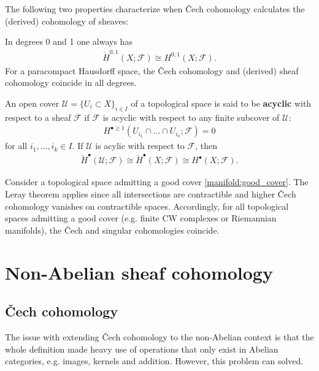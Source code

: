     The following two properties characterize when \v{C}ech cohomology calculates the (derived) cohomology of sheaves:
    \begin{property}
        In degrees 0 and 1 one always has
        \begin{gather}
            \check{H}^{0,1}(X;\mathcal{F})\cong H^{0,1}(X;\mathcal{F}).
        \end{gather}
        For a paracompact Hausdorff space, the \v{C}ech cohomology and (derived) sheaf cohomology coincide in all degrees.
    \end{property}
    \begin{property}[Leray]
        An open cover $\mathcal{U}=\{U_i\subset X\}_{i\in I}$ of a topological space is said to be \textbf{acyclic} with respect to a sheaf $\mathcal{F}$ if $\mathcal{F}$ is acyclic with respect to any finite subcover of $\mathcal{U}$:
        \begin{gather}
            H^{\bullet\geq1}(U_{i_1}\cap\ldots\cap U_{i_k};\mathcal{F})=0
        \end{gather}
        for all $i_1,\ldots,i_k\in I$. If $\mathcal{U}$ is acylic with respect to $\mathcal{F}$, then
        \begin{gather}
            \check{H}^\bullet(\mathcal{U};\mathcal{F})\cong\check{H}^\bullet(X;\mathcal{F})\cong H^\bullet(X;\mathcal{F}).
        \end{gather}
    \end{property}
    \begin{example}
        Consider a topological space admitting a good cover \ref{manifold:good_cover}. The Leray theorem applies since all intersections are contractible and higher \v{C}ech cohomology vanishes on contractible spaces. Accordingly, for all topological spaces admitting a good cover (e.g. finite CW complexes or Riemannian manifolds), the \v{C}ech and singular cohomologies coincide.
    \end{example}

\section{Non-Abelian sheaf cohomology}
\subsection{\v{C}ech cohomology}

    The issue with extending \v{Cech} cohomology to the non-Abelian context is that the whole definition made heavy use of operations that only exist in Abelian categories, e.g. images, kernels and addition. However, this problem can solved.

